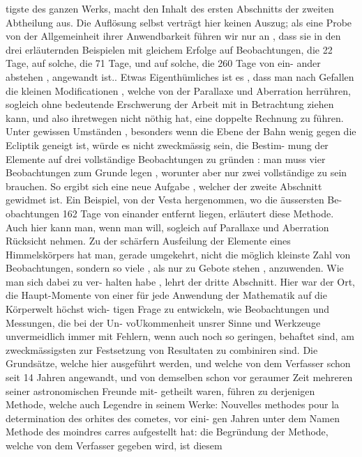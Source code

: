 \documentclass[12pt,a4paper]{article}
\begin{document}
\newpage

tigste  des  ganzen  Werks,  macht  den  Inhalt  des  ersten  Abschnitts  der  zweiten
Abtheilung  aus.  Die  Auflösung  selbst  verträgt  hier  keinen  Auszug;  als  eine
Probe  von  der  Allgemeinheit  ihrer  Anwendbarkeit  führen  wir  nur  an ,  dass  sie
in  den  drei  erläuternden  Beispielen  mit  gleichem  Erfolge  auf  Beobachtungen,
die  22  Tage,  auf  solche,  die  71  Tage,  und  auf  solche,  die  260  Tage  von  ein-
ander abstehen ,  angewandt  ist..  Etwas  Eigenthümliches  ist  es ,  dass  man  nach
Gefallen  die  kleinen  Modificationen ,  welche  von  der  Parallaxe  und  Aberration
herrühren,  sogleich  ohne  bedeutende  Erschwerung  der  Arbeit  mit  in  Betrachtung
ziehen  kann,  und  also  ihretwegen  nicht  nöthig  hat,  eine  doppelte  Rechnung  zu
führen.
Unter  gewissen  Umständen ,  besonders  wenn  die  Ebene  der  Bahn  wenig
gegen  die  Ecliptik  geneigt  ist,  würde  es  nicht  zweckmässig  sein,  die  Bestim-
mung der  Elemente  auf  drei  vollständige  Beobachtungen  zu  gründen :  man  muss
vier  Beobachtungen  zum  Grunde  legen ,  worunter  aber  nur  zwei  vollständige  zu
sein  brauchen.  So  ergibt  sich  eine  neue  Aufgabe ,  welcher  der  zweite  Abschnitt
gewidmet  ist.  Ein  Beispiel,  von  der  Vesta  hergenommen,  wo  die  äussersten  Be-
obachtungen 162  Tage  von  einander  entfernt  liegen,  erläutert  diese  Methode.
Auch  hier  kann  man,  wenn  man  will,  sogleich  auf  Parallaxe  und  Aberration
Rücksicht  nehmen.
Zu  der  schärfern  Ausfeilung  der  Elemente  eines  Himmelskörpers  hat  man,
gerade  umgekehrt,  nicht  die  möglich  kleinste  Zahl  von  Beobachtungen,  sondern
so  viele ,  als  nur  zu  Gebote  stehen ,  anzuwenden.  Wie  man  sich  dabei  zu  ver-
halten habe ,  lehrt  der  dritte  Abschnitt.  Hier  war  der  Ort,  die  Haupt-Momente
von  einer  für  jede  Anwendung  der  Mathematik  auf  die  Körperwelt  höchst  wich-
tigen Frage  zu  entwickeln,  wie  Beobachtungen  und  Messungen,  die  bei  der  Un-
voUkommenheit  unsrer  Sinne  und  Werkzeuge  unvermeidlich  immer  mit  Fehlern,
wenn  auch  noch  so  geringen,  behaftet  sind,  am  zweckmässigsten  zur  Festsetzung
von  Resultaten  zu  combiniren  sind.  Die  Grundsätze,  welche  hier  ausgeführt
werden,  und  welche  von  dem  Verfasser  schon  seit  14  Jahren  angewandt,  und  von
demselben  schon  vor  geraumer  Zeit  mehreren  seiner  astronomischen  Freunde  mit-
getheilt  waren,  führen  zu  derjenigen  Methode,  welche  auch  Legendre  in  seinem
Werke:  Nouvelles  methodes pour  la  determination  des  orhites  des  cometes,  vor  eini-
gen Jahren  unter  dem  Namen  Methode  des  moindres  carres  aufgestellt  hat:  die
Begründung  der  Methode,  welche  von  dem  Verfasser  gegeben  wird,  ist  diesem
\end{document}
